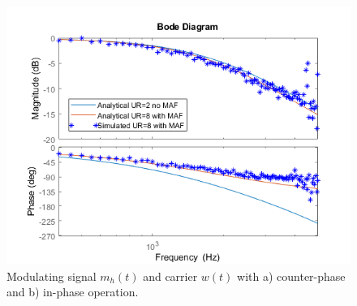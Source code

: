 \documentclass[journal]{IEEEtran}
\begin{document}
\begin{figure}[t!]
    \centerline{\includegraphics[width=0.95\linewidth]{figures/nas_clfra.png}}
    \caption{Modulating signal $m_h(t)$ and carrier $w(t)$ with a) counter-phase and b) in-phase operation.}
    \label{fig:InCounterPhase}
\end{figure}
\end{document}
